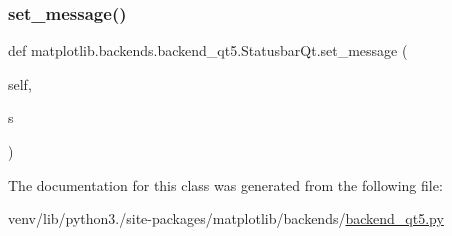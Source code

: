 \subsubsection{\texorpdfstring{set\+\_\+message()}{set\_message()}}
{\footnotesize\ttfamily def matplotlib.\+backends.\+backend\+\_\+qt5.\+Statusbar\+Qt.\+set\+\_\+message (\begin{DoxyParamCaption}\item[{}]{self,  }\item[{}]{s }\end{DoxyParamCaption})}



The documentation for this class was generated from the following file\+:\begin{DoxyCompactItemize}
\item 
venv/lib/python3./site-\/packages/matplotlib/backends/\hyperlink{backend__qt5_8py}{backend\+\_\+qt5.\+py}\end{DoxyCompactItemize}
